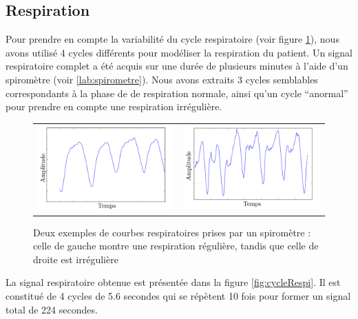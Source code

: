 		\subsection{Respiration}


Pour prendre en compte la variabilité du cycle respiratoire (voir figure \ref{fig:variabCycle}), nous avons utilisé 4 cycles différents pour modéliser la respiration du patient. Un signal respiratoire complet a été acquis sur une durée de plusieurs minutes à l'aide d'un spiromètre (voir \ref{lab:spirometre}). Nous avons extraits 3 cycles semblables correspondants à la phase de de respiration normale, ainsi qu'un cycle ``anormal'' pour prendre en compte une respiration irrégulière.

\begin{figure}
 \centering
 \begin{tabular}{c c}
 \includegraphics[width=8cm]{images/respiReguliere} &
 \includegraphics[width=8cm]{images/respiIrreguliere}
 \end{tabular}
 \caption[Exemple de courbes respiratoires régulière et irrégulière]{Deux exemples de courbes respiratoires prises par un spiromètre : celle de gauche montre une respiration régulière, tandis que celle de droite est irrégulière}
 \label{fig:variabCycle}
\end{figure}


La signal respiratoire obtenue est présentée dans la figure \ref{fig:cycleRespi}. Il est constitué de 4 cycles de 5.6 secondes qui se répètent 10 fois pour former un signal total de 224 secondes. 

